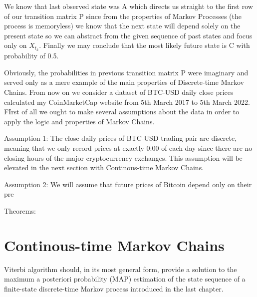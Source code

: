 We know that last observed state was A which directs us straight to the first row of our transition matrix P since from the properties of Markov Processes (the process is memoryless) we know that the next state will depend solely on the present state so we can abstract from the given sequence of past states and focus only on $X_{t_{k}}$. Finally we may conclude that the most likely future state is C with probability of 0.5. 

Obviously, the probabilities in previous transition matrix P were imaginary and served only as a mere example of the main properties of Discrete-time Markov Chains. From now on we consider a dataset of BTC-USD daily close prices calculated my CoinMarketCap website from 5th March 2017 to 5th March 2022. FIrst of all we ought to make several assumptions about the data in order to apply the logic and properties of Markov Chains. 

Assumption 1: The close daily prices of BTC-USD trading pair are discrete, meaning that we only record prices at exactly 0:00 of each day since there are no closing hours of the major cryptocurrency exchanges. This assumption will be elevated in the next section with Continous-time Markov Chains.

Assumption 2: We will assume that future prices of Bitcoin depend only on their pre





Theorems:





\section{Continous-time Markov Chains}  %
\label{section1.3}

















Viterbi algorithm should, in its most general form, provide a solution to the maximum a posteriori probability (MAP) estimation of the state sequence of a finite-state discrete-time Markov process introduced in the last chapter. 


